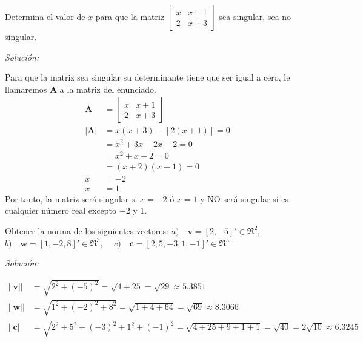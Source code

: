 \documentclass[12pt]{article}
\newenvironment{problem}[2][Problema]{\begin{trivlist}
\item[\hskip \labelsep {\bfseries #1}\hskip \labelsep {\bfseries #2.}]}{\end{trivlist}}
\newenvironment{sol}
    {\emph{Solución:}
    }
    {
    }
\begin{document}
\pagebreak

\begin{problem}{7}
Determina el valor de $x$ para que la matriz 
$\begin{bmatrix}
	x & x+1 \\
	2 & x+3 
\end{bmatrix}$ sea singular, sea no singular.
\end{problem}

\begin{sol}
Para que la matriz sea singular su determinante tiene que ser igual a cero, le llamaremos \textbf{A} a la matriz del enunciado.
\begin{align*}
\mathbf{A}&=
\begin{bmatrix}
	x & x+1 \\
	2 & x+3 
\end{bmatrix}\\
|\mathbf{A}| &= 
x(x+3) -[ 2(x+1)] = 0 \\
&= x^2+3x -2x-2 = 0 \\
&= x^2 +x -2 =0\\
&= (x+2)(x-1)=0\\
x&=-2\\
x&=1
\end{align*}
Por tanto, la matriz será singular si $x=-2$ ó $x=1$ y NO será singular si es cualquier número real excepto $-2$ y $1$.
\end{sol}

\pagebreak

\begin{problem}{8}
Obtener la norma de los siguientes vectores: $a)\quad\mathbf{v}=[2,-5]' \in \Re^2$,\\
 $b)\quad\mathbf{w}=[1,-2,8]' \in \Re^3$, $\quad c) \quad\mathbf{c}=[2,5,-3,1,-1]' \in \Re^5$
\end{problem}
\begin{sol}
\begin{align*}
||\mathbf{v}|| &= \sqrt{2^2+(-5)^2}=\sqrt{4+25}=\sqrt{29}\approx  5.3851\\
||\mathbf{w}|| &= \sqrt{1^2+(-2)^2+8^2} = \sqrt{1+4+64} = \sqrt{69} \approx 8.3066 \\
||\mathbf{c}|| &=  \sqrt{2^2+5^2+(-3)^2+1^2+(-1)^2} = \sqrt{4+25+9+1+1} = \sqrt{40} = 2\sqrt{10} \approx 6.3245
\end{align*}


\end{sol}

\pagebreak
\end{document}
